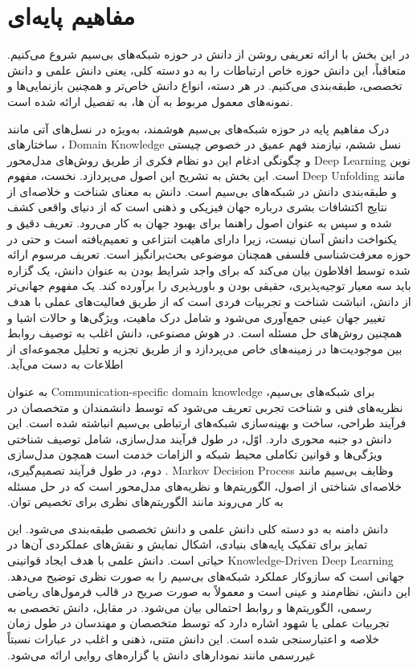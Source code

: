\chapter{مفاهیم پایه‌ای}
\label{chap:concepts}
در این بخش با ارائه تعریفی روشن از دانش در حوزه شبکه‌های بی‌سیم شروع می‌کنیم. متعاقباً، این دانش حوزه خاص ارتباطات را به دو دسته کلی، یعنی دانش علمی و دانش تخصصی، طبقه‌بندی می‌کنیم. در هر دسته، انواع دانش خاص‌تر و همچنین بازنمایی‌ها و نمونه‌های معمول مربوط به آن ها، به تفصیل ارائه شده است.

‫درک مفاهیم پایه در حوزه شبکه‌های بی‌سیم هوشمند، به‌ویژه در نسل‌های آتی مانند نسل ششم، نیازمند فهم عمیق در خصوص چیستی 
\gls{Domain Knowledge}
، ساختارهای نوین 
\gls{Deep Learning}
و چگونگی ادغام این دو نظام فکری از طریق روش‌های مدل‌محور مانند 
\gls{Deep Unfolding}
 است. این بخش به تشریح این اصول می‌پردازد.‬
نخست، مفهوم و طبقه‌بندی دانش در شبکه‌های بی‌سیم‬ است.
‫دانش به معنای شناخت و خلاصه‌ای از نتایج اکتشافات بشری درباره جهان فیزیکی و ذهنی است که از دنیای واقعی کشف شده و سپس به عنوان اصول راهنما برای بهبود جهان به کار می‌رود. تعریف دقیق و یکنواخت دانش آسان نیست، زیرا دارای ماهیت انتزاعی و تعمیم‌یافته است و حتی در حوزه معرفت‌شناسی فلسفی همچنان موضوعی بحث‌برانگیز است. تعریف مرسوم ارائه شده توسط افلاطون بیان می‌کند که برای واجد شرایط بودن به عنوان دانش، یک گزاره باید سه معیار توجیه‌پذیری، حقیقی بودن و باورپذیری را برآورده کند. یک مفهوم جهانی‌تر از دانش، انباشت شناخت و تجربیات فردی است که از طریق فعالیت‌های عملی با هدف تغییر جهان عینی جمع‌آوری می‌شود و شامل درک ماهیت، ویژگی‌ها و حالات اشیا و همچنین روش‌های حل مسئله است. در هوش مصنوعی، دانش اغلب به توصیف روابط بین موجودیت‌ها در زمینه‌های خاص می‌پردازد و از طریق تجزیه و تحلیل مجموعه‌ای از اطلاعات به دست می‌آید.‬

‫برای شبکه‌های بی‌سیم، 
\gls{Communication-specific domain knowledge}
به عنوان نظریه‌های فنی و شناخت تجربی تعریف می‌شود که توسط دانشمندان و متخصصان در فرآیند طراحی، ساخت و بهینه‌سازی شبکه‌های ارتباطی بی‌سیم انباشته شده است. این دانش دو جنبه محوری دارد. اوّل، در طول فرآیند مدل‌سازی، شامل توصیف شناختی ویژگی‌ها و قوانین تکاملی محیط شبکه و الزامات خدمت است همچون مدل‌سازی وظایف بی‌سیم مانند 
\gls{Markov Decision Process}
. دوم، در طول فرآیند تصمیم‌گیری، خلاصه‌ای شناختی از اصول، الگوریتم‌ها و نظریه‌های مدل‌محور است که در حل مسئله به کار می‌روند مانند الگوریتم‌های نظری برای تخصیص توان.‬

‫دانش دامنه به دو دسته کلی دانش علمی و دانش تخصصی طبقه‌بندی می‌شود. این تمایز برای تفکیک پایه‌های بنیادی، اشکال نمایش و نقش‌های عملکردی آن‌ها در 
\gls{Knowledge-Driven Deep Learning}
حیاتی است. دانش علمی با هدف ایجاد قوانینی جهانی است که سازوکار عملکرد شبکه‌های بی‌سیم را به صورت نظری توضیح می‌دهد. این دانش، نظام‌مند و عینی است و معمولاً به صورت صریح در قالب فرمول‌های ریاضی رسمی، الگوریتم‌ها و روابط احتمالی بیان می‌شود. در مقابل، دانش تخصصی به تجربیات عملی یا شهود اشاره دارد که توسط متخصصان و مهندسان در طول زمان خلاصه و اعتبارسنجی شده است. این دانش متنی، ذهنی و اغلب در عبارات نسبتاً غیررسمی مانند نمودارهای دانش یا گزاره‌های روایی ارائه می‌شود.‬

